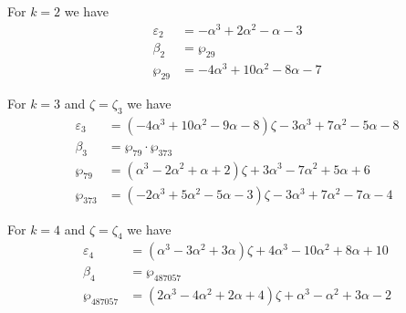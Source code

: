 \documentclass[12pt]{amsart}
\theoremstyle{definition}
\def\a{\alpha}
\def\z{\zeta}
\def\z{\zeta}
\begin{document}
\noindent 
For $k=2$ %
we have
{\small
\begin{align*}
\varepsilon_{2} &= -\a^3 + 2 \a^2 - \a - 3
\\
\beta_{2} &= \wp_{29}  \\
\wp_{29} &= -4 \a^3 + 10 \a^2 - 8 \a - 7
\end{align*}
}

\noindent 
For $k=3$ and $\zeta=\zeta_3$
we have
{\small
\begin{align*}
\varepsilon_{3} &= 
(-4 \a^3 + 10 \a^2 - 9 \a - 8) \z - 3 \a^3 + 7 \a^2 - 5 \a - 8
\\
\beta_{3} &= \wp_{79} \cdot \wp_{373} \\
\wp_{79} &= (\a^3 - 2 \a^2 + \a + 2) \z + 3 \a^3 - 7 \a^2 + 5 \a + 6
\\
\wp_{373} &= (-2 \a^3 + 5 \a^2 - 5 \a - 3) \z - 3 \a^3 + 7 \a^2 - 7 \a - 4
\end{align*}
}

\noindent 
For $k=4$ and $\zeta=\zeta_4$ we have
{\small
\begin{align*}
\varepsilon_{4} &= 
(\a^3 - 3 \a^2 + 3 \a) \z + 4 \a^3 - 10 \a^2 + 8 \a + 10
\\
\beta_{4} &= \wp_{487057}  \\
\wp_{487057} &=
(2 \a^3 - 4 \a^2 + 2 \a + 4) \z + \a^3 - \a^2 + 3 \a - 2
\end{align*}
}
\end{document}
